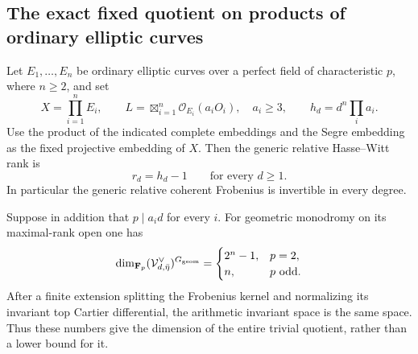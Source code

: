 \subsection{The exact fixed quotient on products of ordinary elliptic curves}
\label{subsec:product-exact-fixed-quotient}

\begin{theorem}\label{thm:product-exact-fixed-covectors}
Let $E_1,\ldots,E_n$ be ordinary elliptic curves over a
perfect field of characteristic $p$, where $n\geq2$, and set
\[
 X=\prod_{i=1}^nE_i,\qquad
 L=\boxtimes_{i=1}^n\mathcal O_{E_i}(a_iO_i),\quad a_i\geq3,
 \qquad h_d=d^n\prod_i a_i.
\]
Use the product of the indicated complete embeddings and
the Segre embedding as the fixed projective embedding of $X$.
Then the generic relative Hasse--Witt rank is
\begin{equation}\label{eq:product-elliptic-generic-rank}
 r_d=h_d-1\qquad\text{for every }d\geq1.
\end{equation}
In particular the generic relative coherent Frobenius is
invertible in every degree.

Suppose in addition that $p\mid a_i d$ for every $i$.
For geometric monodromy on its maximal-rank open one has
\begin{equation}\label{eq:product-entire-fixed-space}
 \dim_{\mathbf F_p}(\mathcal V_{d,\bar\eta}^{\vee})^{G_{\rm geom}}
 =\begin{cases}
       2^n-1,&p=2,\\
       n,&p\text{ odd}.
   \end{cases}
\end{equation}
After a finite extension splitting the Frobenius kernel
and normalizing its invariant top Cartier differential,
the arithmetic invariant space is the same space.
Thus these numbers give the dimension of the entire
trivial quotient, rather than a lower bound for it.
\end{theorem}

